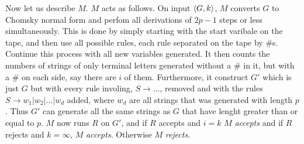 \documentclass[a4paper,11pt]{article}
\numberwithin{equation}{section}
\begin{document}
Now let us describe $ M $.
$ M $ acts as follows. On input $ \braket{G,k} $, $ M $ converts $ G $ to Chomsky normal form and perfom all derivations of $ 2p-1 $ steps or less simultaneously. This is done by simply starting with the start varibale on the tape, and then use all possible rules, each rule separated on the tape by $\#$s. Continue this process with all new variables generated. It then counts the numbers of strings of only terminal letters generated without a $\#$ in it, but with a $\#$ on each side, say there are $ i $ of them. Furthermore, it construct $ G' $ which is just $ G $ but with every rule involing, $ S\to... $, removed and with the rules $ S\to w_1|w_2|...|w_d $ added, where $ w_d $ are all strings that was generated with length $ p $. Thus $ G' $ can generate all the same strings as $ G $ that have lenght greater than or equal to $ p $. $ M $ now runs $ R $ on $ G' $, and if $ R $ accepts and $ i=k $ $ M $ \emph{accepts} and if $ R $ rejects and $ k=\infty $, $ M $ \emph{accepts}. Otherwise $ M $ \emph{rejects}.
\end{document}
